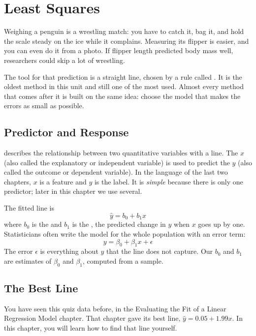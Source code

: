 \chapter{Least Squares}

Weighing a penguin is a wrestling match: you have to catch it, bag it, and hold the scale steady on the ice
while it complains. Measuring its flipper is easier, and you can even do it from a photo. If flipper length
predicted body mass well, researchers could skip a lot of wrestling.

The tool for that prediction is a straight line, chosen by a rule called . It is
the oldest method in this unit and still one of the most used. Almost every method that comes after it is
built on the same idea: choose the model that makes the errors as small as possible.

\section{Predictor and Response}
 describes the relationship between two quantitative variables with a
line. The  $x$ (also called the explanatory or independent
variable) is used to predict the  $y$ (also called the outcome or
dependent variable). In the language of the last two chapters, $x$ is a feature and $y$ is the label. It is
\emph{simple} because there is only one predictor; later in this chapter we use several.

The fitted line is
$$\hat{y} = b_0 + b_1 x$$
where $b_0$ is the  and $b_1$ is the , the predicted change in $y$ when $x$
goes up by one. Statisticians often write the model for the whole population with an error term:
$$y = \beta_0 + \beta_1 x + \epsilon$$
The error $\epsilon$ is everything about $y$ that the line does not capture. Our $b_0$ and $b_1$ are
estimates of $\beta_0$ and $\beta_1$, computed from a sample.

\section{The Best Line}
You have seen this quiz data before, in the Evaluating the Fit of a Linear Regression Model chapter. That chapter gave its best line, $\hat{y} = 0.05 + 1.99x$. In this chapter, you will learn how to find that line yourself.

